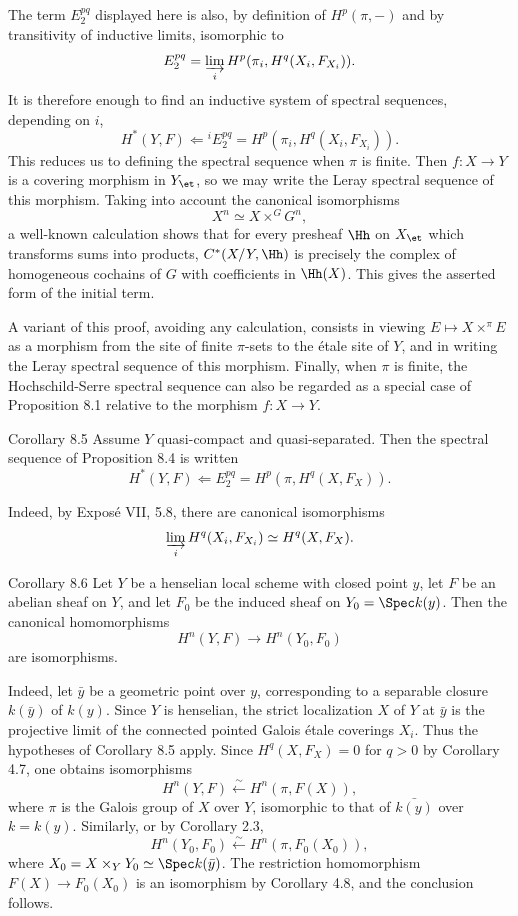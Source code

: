 The term \(E_2^{pq}\) displayed here is also, by definition of \(H^p(\pi,-)\) and by transitivity of inductive limits, isomorphic to
\[
E_2^{pq}=\varinjlim_i H^p(\pi_i,H^q(X_i,F_{X_i})).
\]
It is therefore enough to find an inductive system of spectral sequences, depending on \(i\),
\[
H^*(Y,F)\Longleftarrow {}^iE_2^{pq}=H^p(\pi_i,H^q(X_i,F_{X_i})).
\]
This reduces us to defining the spectral sequence when \(\pi\) is finite. Then \(f:X\to Y\) is a covering morphism in \(Y_{\et}\), so we may write the Leray spectral sequence of this morphism. Taking into account the canonical isomorphisms
\[
X^n\simeq X\times^G G^n,
\]
a well-known calculation shows that for every presheaf \(\Hh\) on \(X_{\et}\) which transforms sums into products, \(C^*(X/Y,\Hh)\) is precisely the complex of homogeneous cochains of \(G\) with coefficients in \(\Hh(X)\). This gives the asserted form of the initial term.

A variant of this proof, avoiding any calculation, consists in viewing \(E\mapsto X\times^\pi E\) as a morphism from the site of finite \(\pi\)-sets to the \'etale site of \(Y\), and in writing the Leray spectral sequence of this morphism. Finally, when \(\pi\) is finite, the Hochschild-Serre spectral sequence can also be regarded as a special case of Proposition 8.1 relative to the morphism \(f:X\to Y\).

\begin{statement}{Corollary 8.5}
Assume \(Y\) quasi-compact and quasi-separated. Then the spectral sequence of Proposition 8.4 is written
\[
H^*(Y,F)\Longleftarrow E_2^{pq}=H^p(\pi,H^q(X,F_X)).
\]
\end{statement}

Indeed, by Expos\'e VII, 5.8, there are canonical isomorphisms
\[
\varinjlim_iH^q(X_i,F_{X_i})\simeq H^q(X,F_X).
\]

\begin{statement}{Corollary 8.6}
Let \(Y\) be a henselian local scheme with closed point \(y\), let \(F\) be an abelian sheaf on \(Y\), and let \(F_0\) be the induced sheaf on \(Y_0=\Spec k(y)\). Then the canonical homomorphisms
\[
H^n(Y,F)\longrightarrow H^n(Y_0,F_0)
\]
are isomorphisms.
\end{statement}

Indeed, let \(\bar y\) be a geometric point over \(y\), corresponding to a separable closure \(k(\bar y)\) of \(k(y)\). Since \(Y\) is henselian, the strict localization \(X\) of \(Y\) at \(\bar y\) is the projective limit of the connected pointed Galois \'etale coverings \(X_i\). Thus the hypotheses of Corollary 8.5 apply. Since \(H^q(X,F_X)=0\) for \(q>0\) by Corollary 4.7, one obtains isomorphisms
\[
H^n(Y,F)\xleftarrow{\sim}H^n(\pi,F(X)),
\]
where \(\pi\) is the Galois group of \(X\) over \(Y\), isomorphic to that of \(\bar{k(y)}\) over \(k=k(y)\). Similarly, or by Corollary 2.3,
\[
H^n(Y_0,F_0)\xleftarrow{\sim}H^n(\pi,F_0(X_0)),
\]
where \(X_0=X\times_YY_0\simeq\Spec k(\bar y)\). The restriction homomorphism \(F(X)\to F_0(X_0)\) is an isomorphism by Corollary 4.8, and the conclusion follows.

